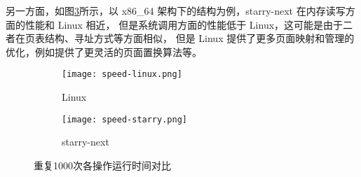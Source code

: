 
另一方面，如图\ref{Fig.main2}所示，以 x86\_64 架构下的结构为例，starry-next 在内存读写方面的性能和 Linux 相近，
但是系统调用方面的性能低于 Linux，这可能是由于二者在页表结构、寻址方式等方面相似，
但是 Linux 提供了更多页面映射和管理的优化，例如提供了更灵活的页面置换算法等。


\begin{figure}[H]
    \centering  %
    \begin{subfigure}[t]{0.45\textwidth}
        \centering
        \texttt{[image: speed-linux.png]}
        \caption{Linux}
        \label{fig:sub.3}
    \end{subfigure}
    \hfill %
    \begin{subfigure}[t]{0.45\textwidth}
        \centering
        \texttt{[image: speed-starry.png]}
        \caption{starry-next}
        \label{fig:sub.4}
    \end{subfigure}
    \caption{重复1000次各操作运行时间对比}
    \label{Fig.main2}
\end{figure}

